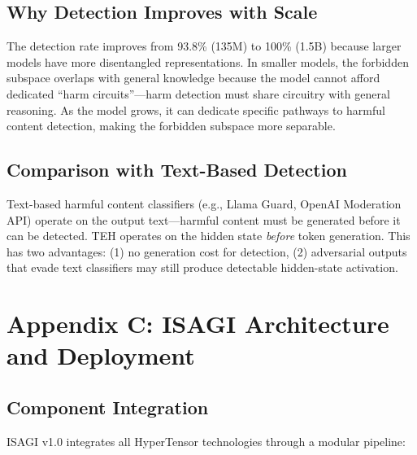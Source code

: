 \documentclass[11pt,a4paper]{article}
\begin{document}
\subsection{Why Detection Improves with Scale}

The detection rate improves from 93.8\% (135M) to 100\% (1.5B) because larger models have more disentangled representations. In smaller models, the forbidden subspace overlaps with general knowledge because the model cannot afford dedicated ``harm circuits''---harm detection must share circuitry with general reasoning. As the model grows, it can dedicate specific pathways to harmful content detection, making the forbidden subspace more separable.

\subsection{Comparison with Text-Based Detection}

Text-based harmful content classifiers (e.g., Llama Guard, OpenAI Moderation API) operate on the output text---harmful content must be generated before it can be detected. TEH operates on the hidden state \textit{before} token generation. This has two advantages: (1) no generation cost for detection, (2) adversarial outputs that evade text classifiers may still produce detectable hidden-state activation.

\newpage

\section{Appendix C: ISAGI Architecture and Deployment}

\subsection{Component Integration}

ISAGI v1.0 integrates all HyperTensor technologies through a modular pipeline:
\end{document}
